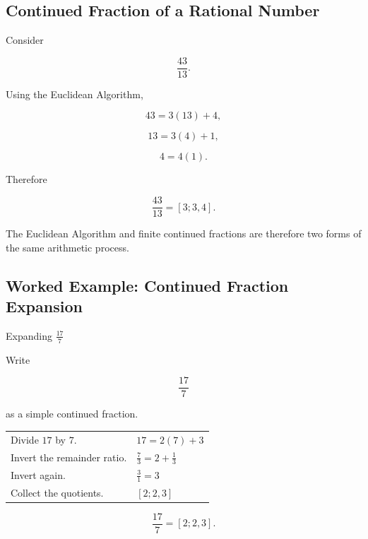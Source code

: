 \subsection{Continued Fraction of a Rational Number}
\label{subsec:rational-continued-fraction}

Consider

\[ \frac{43}{13}. \]

Using the Euclidean Algorithm,

\[
43=3(13)+4,
\]

\[
13=3(4)+1,
\]

\[
4=4(1).
\]

Therefore

\[ \boxed{\frac{43}{13}=[3;3,4].} \]

The Euclidean Algorithm and finite continued fractions are therefore two
forms of the same arithmetic process.

\subsection{Worked Example: Continued Fraction Expansion}
\label{subsec:worked-continued-fraction-expansion}

\begin{workedexamplebox}{Expanding \(\frac{17}{7}\)}

Write

\[ \frac{17}{7} \]

as a simple continued fraction.

\begin{tabularx}{\textwidth}{@{}>{\raggedright\arraybackslash}p{}X@{}}
Divide \(17\) by \(7\). & \(17=2(7)+3\)\\
Invert the remainder ratio. & \(\frac73=2+\frac13\)\\
Invert again. & \(\frac31=3\)\\
Collect the quotients. & \([2;2,3]\)
\end{tabularx}

\begin{answerbox}
\[ \boxed{\frac{17}{7}=[2;2,3].} \]
\end{answerbox}
\end{workedexamplebox}

